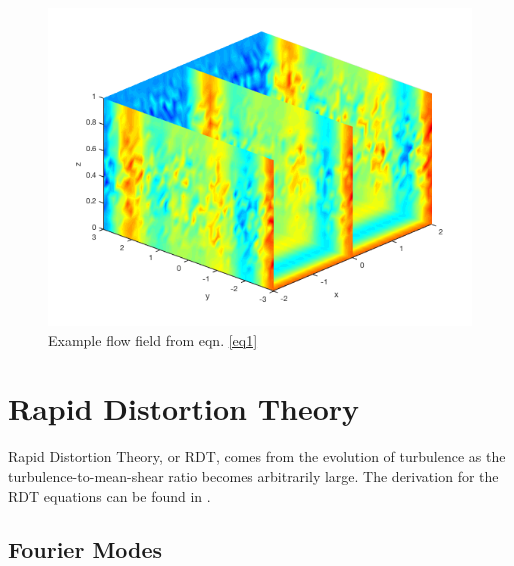 \documentclass[paper=a4, fontsize=11pt]{scrartcl} %
\numberwithin{equation}{section} %
\numberwithin{figure}{section} %
\numberwithin{table}{section} %
\begin{document}
\begin{figure}
    \includegraphics[width=\linewidth]{../data/fieldModesInit.png}
    \caption{Example flow field from eqn. \ref{eq1}}
    \label{fig:exflow}
\end{figure}


\pagebreak
\section{Rapid Distortion Theory}

Rapid Distortion Theory, or RDT, comes from the evolution of turbulence as the turbulence-to-mean-shear ratio becomes arbitrarily large. The derivation for the RDT equations can be found in \cite{pope}.

\subsection{Fourier Modes}
\end{document}
